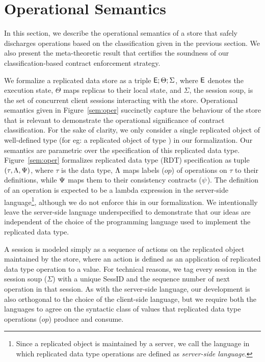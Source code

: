\section{Operational Semantics}
\label{sec:core-opsem}

In this section, we describe the operational semantics of a store that safely
discharges operations based on the classification given in the previous
section. We also present the meta-theoretic result that certifies the soundness
of our classification-based contract enforcement strategy.

We formalize a replicated data store as a triple ${\normalfont \textsf{E}};\Theta;\Sigma$, where ${\normalfont \textsf{E}}$
denotes the execution state, $\Theta$ maps replicas to their local state, and
$\Sigma$, the session soup, is the set of concurrent client sessions
interacting with the store.  Operational semantics given in
Figure~\ref{sem:oper} succinctly capture the behaviour of the store that is
relevant to demonstrate the operational significance of contract
classification. For the sake of clarity, we only consider a single replicated
object of well-defined type (for eg: a replicated object of type
) in our formalization. Our semantics are parametric over the
specification of this replicated data type.  Figure~\ref{sem:oper} formalizes
replicated data type (RDT) specification as tuple $(\tau,\Lambda,\Psi)$, where
$\tau$ is the data type, $\Lambda$ maps labels ($op$) of operations on $\tau$ to
their definitions, while $\Psi$ maps them to their consistency contracts
($\psi$). The definition of an operation is expected to be a lambda expression
in the server-side language\footnote{Since a replicated object is maintained by
a server, we call the language in which replicated data type operations are
defined as \emph{server-side language}.}, although we do not enforce this in
our formalization. We intentionally leave the server-side language
underspecified to demonstrate that our ideas are independent of the choice of
the programming language used to implement the replicated data type.



A session is modeled simply as a sequence of actions on the replicated object
maintained by the store, where an action is defined as an application of
replicated data type operation to a value. For technical reasons, we tag every
session in the session soup ($\Sigma$) with a unique {\sf SessID} and the
sequence number of next operation in that session. As with the server-side
language, our development is also orthogonal to the choice of the client-side
language, but we require both the languages to agree on the syntactic class of
values that replicated data type operations ($op$) produce and consume.

